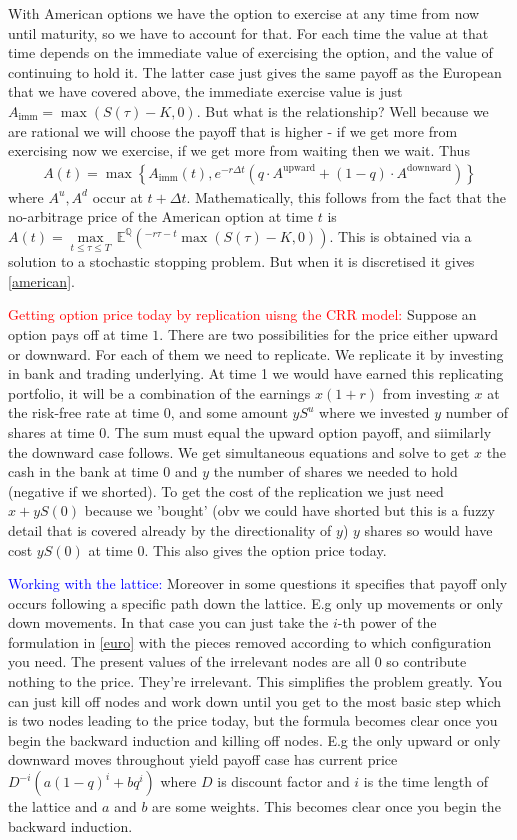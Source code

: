 \documentclass[9pt]{extarticle}
\begin{document}
With American options we have the option to exercise at any time from now until maturity, so we have to account for that. For each time the value at that 
time depends on the immediate value of exercising the option, and the value of continuing to hold it. The latter case just gives the same payoff as the European that 
we have covered above, the immediate exercise value is just $A_{\text{imm}} = \operatorname{max}(S(\tau)-K,0)$. But what is the relationship? Well because 
we are rational we will choose the payoff that is higher - if we get more from exercising now we exercise, if we get more from waiting then we wait. Thus 
\begin{align}\label{american}
  A(t) = \operatorname{max}\left\{A_{\text{imm}}(t), e^{-r\Delta t}\left(q\cdot A^{\text{upward}} + (1-q)\cdot A^{\text{downward}}\right)\right\}
\end{align}
where $A^u,A^d$ occur at $t+\Delta t$. Mathematically, this follows from the fact that the no-arbitrage price 
of the American option at time $t$ is $A(t)=\underset{t\leq \tau \leq T}{\max}\, \mathbb{E}^{\mathbb{Q}}(^{-r\tau -t}\max(S(\tau)-K,0))$. This 
is obtained via a solution to a stochastic stopping problem. But when it is discretised it gives \eqref{american}.


\textcolor{red}{Getting option price today by replication uisng the CRR model:} Suppose an option pays off at time $1$. There are two possibilities for the 
price either upward or downward. For each of them we need to replicate. We replicate it by 
investing in bank and trading underlying. At time 1 we would have earned this replicating portfolio, it will be a combination 
of the earnings $x(1+r)$ from investing $x$ at the risk-free rate at time 0, and some amount $yS^u$ where we invested 
$y$ number of shares at time 0. The sum must equal the upward option payoff, and siimilarly the downward case follows. We get simultaneous equations and 
solve to get $x$ the cash in the bank at time 0 and $y$ the number of shares we needed to hold (negative if we shorted). To get the cost of the 
replication we just need $x+yS(0)$ because we 'bought' (obv we could have shorted but this is a fuzzy detail that is covered already 
by the directionality of $y$) $y$ shares so would have cost $yS(0)$ at time 0. This also gives the option price today. 


\textcolor{blue}{Working with the lattice:} Moreover in some questions it specifies that payoff only occurs following a specific path down the lattice. E.g only up movements or only down movements. In that case you 
can just take the $i$-th power of the formulation in \eqref{euro} with the pieces removed according to which configuration you need. The present values of the 
irrelevant nodes are all 0 so contribute nothing to the price. They're irrelevant. This simplifies the problem greatly. You can just kill off nodes and work down 
until you get to the most basic step which is two nodes leading to the price today, but the formula becomes clear once you begin the backward induction and killing off nodes. E.g the 
only upward or only downward moves throughout yield payoff case has current price $D^{-i}(a(1-q)^i + bq^i)$ where $D$ is discount factor and $i$ is the time length of 
the lattice and $a$ and $b$ are some weights. This becomes clear once you begin the backward induction. 
\end{document}
